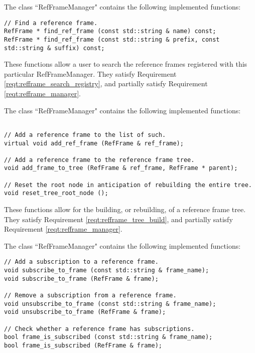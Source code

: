 \label{inspect:refframe_manager}

The class ``RefFrameManager" contains the following implemented functions:

\begin{verbatim}
// Find a reference frame.
RefFrame * find_ref_frame (const std::string & name) const;
RefFrame * find_ref_frame (const std::string & prefix, const std::string & suffix) const;
\end{verbatim}

These functions allow a user to search the reference frames registered with this
particular RefFrameManager. They satisfy
Requirement \ref{reqt:refframe_search_registry}, and partially
satisfy Requirement \ref{reqt:refframe_manager}.

The class ``RefFrameManager" contains the following implemented functions:

\begin{verbatim}

// Add a reference frame to the list of such.
virtual void add_ref_frame (RefFrame & ref_frame);

// Add a reference frame to the reference frame tree.
void add_frame_to_tree (RefFrame & ref_frame, RefFrame * parent);

// Reset the root node in anticipation of rebuilding the entire tree.
void reset_tree_root_node ();

\end{verbatim}

These functions allow for the building, or rebuilding, of a reference frame tree.
They satisfy Requirement \ref{reqt:refframe_tree_build}, and partially
satisfy Requirement \ref{reqt:refframe_manager}.

The class ``RefFrameManager" contains the following implemented functions:

\begin{verbatim}
// Add a subscription to a reference frame.
void subscribe_to_frame (const std::string & frame_name);
void subscribe_to_frame (RefFrame & frame);

// Remove a subscription from a reference frame.
void unsubscribe_to_frame (const std::string & frame_name);
void unsubscribe_to_frame (RefFrame & frame);

// Check whether a reference frame has subscriptions.
bool frame_is_subscribed (const std::string & frame_name);
bool frame_is_subscribed (RefFrame & frame);
\end{verbatim}

